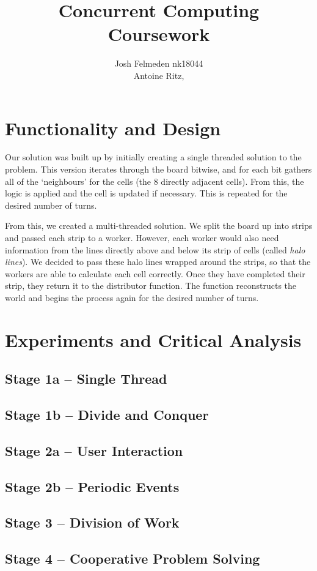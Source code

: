 \documentclass[11pt,a4paper,dvipsnames,cmyk]{scrartcl}
\title{Concurrent Computing Coursework}
\author{Josh Felmeden nk18044 \\ Antoine Ritz, }
\begin{document}
\maketitle
\begin{multicols}{2}
\section*{Functionality and Design}%
\label{sec:func-and-design}
Our solution was built up by initially creating a single threaded solution
to the problem. This version iterates through the board bitwise, and for
each bit gathers all of the `neighbours' for the cells (the 8 directly
adjacent cells). From this, the logic is applied and the cell is updated
if necessary. This is repeated for the desired number of turns.

From this, we created a multi-threaded solution. We split the board up
into strips and passed each strip to a worker. However, each worker would
also need information from the lines directly above and below its strip of
cells (called \textit{halo lines}). We decided to pass these halo lines
wrapped around the strips, so that the workers are able to calculate each
cell correctly. Once they have completed their strip, they return it to
the distributor function. The function reconstructs the world and begins
the process again for the desired number of turns.

\section*{Experiments and Critical Analysis}%
\label{sec:Experiments and Critical Analysis}

\subsection*{Stage 1a -- Single Thread}%
\label{sub:single-thread}

\subsection*{Stage 1b -- Divide and Conquer}%
\label{sub:divide-conquer}

\subsection*{Stage 2a -- User Interaction}%
\label{sub:user-interaction}

\subsection*{Stage 2b -- Periodic Events}%
\label{sub:periodic-events}

\subsection*{Stage 3 -- Division of Work}%
\label{sub:division of work}

\subsection*{Stage 4 -- Cooperative Problem Solving}%
\label{sub:coop-solving}


\end{multicols}
\end{document}
